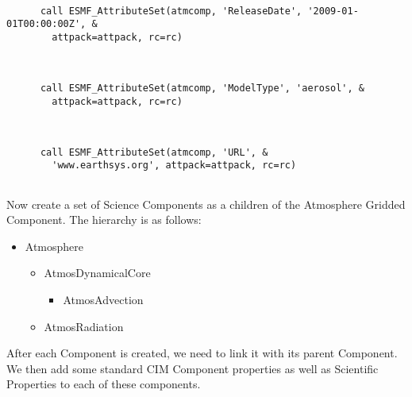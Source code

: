
 \begin{verbatim}

      call ESMF_AttributeSet(atmcomp, 'ReleaseDate', '2009-01-01T00:00:00Z', &
        attpack=attpack, rc=rc)
 
\end{verbatim}
 

 \begin{verbatim}

      call ESMF_AttributeSet(atmcomp, 'ModelType', 'aerosol', &
        attpack=attpack, rc=rc)
 
\end{verbatim}
 

 \begin{verbatim}

      call ESMF_AttributeSet(atmcomp, 'URL', &
        'www.earthsys.org', attpack=attpack, rc=rc)
 
\end{verbatim}
 

  \begin{sloppypar}
      Now create a set of Science Components as a children of the Atmosphere 
      Gridded Component. The hierarchy is as follows:
      \begin{itemize}
         \item Atmosphere
         \begin{itemize}
            \item AtmosDynamicalCore
            \begin{itemize}
               \item AtmosAdvection
            \end{itemize}
            \item AtmosRadiation
         \end{itemize}
      \end{itemize}
      After each Component is created, we need to link it with its parent
      Component.  We then add some standard CIM Component properties as well 
      as Scientific Properties to each of these components.
  \end{sloppypar} 

